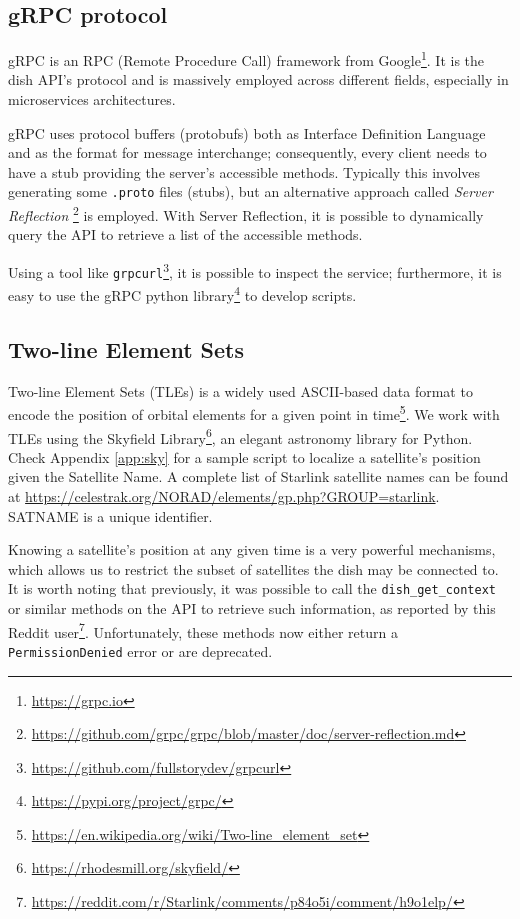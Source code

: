 \documentclass[]{report}
\begin{document}
\subsection{gRPC protocol}
    
gRPC is an RPC (Remote Procedure Call) framework from Google\footnote{\url{https://grpc.io}}. It is the dish API's
protocol and is massively employed across different fields, especially in microservices architectures. 
    
gRPC uses protocol buffers (protobufs) both as Interface Definition Language and as the format for message interchange;
consequently, every client needs to have a stub providing the server's accessible methods. Typically this involves
generating some \texttt{.proto} files (stubs), but an alternative approach called \textit{Server Reflection}
\footnote{\url{https://github.com/grpc/grpc/blob/master/doc/server-reflection.md}} is employed. With Server Reflection,
it is possible to dynamically query the API to retrieve a list of the accessible methods.

Using a tool like \texttt{grpcurl}\footnote{\url{https://github.com/fullstorydev/grpcurl}}, it is possible to inspect
the service; furthermore, it is easy to use the gRPC python library\footnote{\url{https://pypi.org/project/grpc/}} to
develop scripts.
    
\subsection{Two-line Element Sets}
    
Two-line Element Sets (TLEs) is a widely used ASCII-based data format to encode the position of orbital elements for a
given point in time\footnote{\url{https://en.wikipedia.org/wiki/Two-line_element_set}}. We work with TLEs using the
Skyfield Library\footnote{\url{https://rhodesmill.org/skyfield/}}, an elegant astronomy library for Python. Check
Appendix \ref{app:sky} for a sample script to localize a satellite's position given the Satellite Name. A complete list
of Starlink satellite names can be found at \url{https://celestrak.org/NORAD/elements/gp.php?GROUP=starlink}. 
SATNAME is a unique identifier.
    
Knowing a satellite's position at any given time is a very powerful mechanisms, which allows us to restrict the subset
of satellites the dish may be connected to. It is worth noting that previously, it was possible to call the
\texttt{dish\_get\_context} or similar methods on the API to retrieve such information, as reported by this Reddit
user\footnote{\url{https://reddit.com/r/Starlink/comments/p84o5i/comment/h9o1elp/}}. Unfortunately, these methods now
either return a \texttt{PermissionDenied} error or are deprecated.
    
\end{document}
